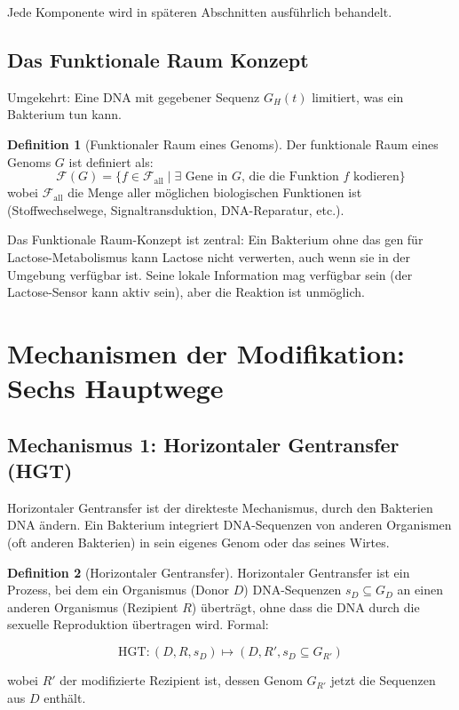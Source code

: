 \documentclass[a4paper,12pt]{article}
\theoremstyle{definition}
\newtheorem{definition}{Definition}
\begin{document}
Jede Komponente wird in späteren Abschnitten ausführlich behandelt.

\subsection{Das Funktionale Raum Konzept}

Umgekehrt: Eine DNA mit gegebener Sequenz $G_H(t)$ limitiert, was ein Bakterium tun kann.

\begin{definition}[Funktionaler Raum eines Genoms]
Der funktionale Raum eines Genoms $G$ ist definiert als:
\[
\mathcal{F}(G) = \{ f \in \mathcal{F}_{\text{all}} \mid \exists \text{ Gene in } G \text{, die die Funktion } f \text{ kodieren} \}
\]
wobei $\mathcal{F}_{\text{all}}$ die Menge aller möglichen biologischen Funktionen ist (Stoffwechselwege, Signaltransduktion, DNA-Reparatur, etc.).

Das Funktionale Raum-Konzept ist zentral: Ein Bakterium ohne das gen für Lactose-Metabolismus kann Lactose nicht verwerten, auch wenn sie in der Umgebung verfügbar ist. Seine lokale Information mag verfügbar sein (der Lactose-Sensor kann aktiv sein), aber die Reaktion ist unmöglich.
\end{definition}

\section{Mechanismen der Modifikation: Sechs Hauptwege}


\subsection{Mechanismus 1: Horizontaler Gentransfer (HGT)}

Horizontaler Gentransfer ist der direkteste Mechanismus, durch den Bakterien DNA ändern. Ein Bakterium integriert DNA-Sequenzen von anderen Organismen (oft anderen Bakterien) in sein eigenes Genom oder das seines Wirtes.

\begin{definition}[Horizontaler Gentransfer]
Horizontaler Gentransfer ist ein Prozess, bei dem ein Organismus (Donor $D$) DNA-Sequenzen $s_D \subseteq G_D$ an einen anderen Organismus (Rezipient $R$) überträgt, ohne dass die DNA durch die sexuelle Reproduktion übertragen wird. Formal:

\[
\text{HGT}: (D, R, s_D) \mapsto (D, R', s_D \subseteq G_{R'})
\]

wobei $R'$ der modifizierte Rezipient ist, dessen Genom $G_{R'}$ jetzt die Sequenzen aus $D$ enthält.
\end{definition}
\end{document}
